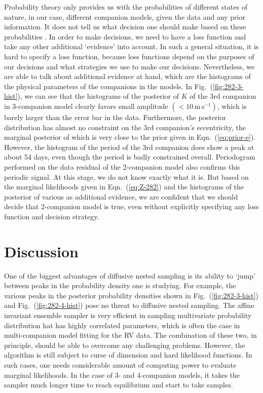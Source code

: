 \documentclass[letterpaper, preprint]{aastex}
\newcommand{\unit}[1]{\mathrm{#1}}
\begin{document}
Probability theory only provides us with the probabilities of different states of nature, in our case, different companion models, given the data and any prior information. It does not tell us what decision one should make based on these probabilities \citep{jaynes03a}. In order to make decisions, we need to have a loss function and take any other additional `evidence' into account. In such a general situation, it is hard to specify a loss function, because loss functions depend on the purposes of our decisions and what strategies we use to make our decisions. Nevertheless, we are able to talk about additional evidence at hand, which are the histograms of the physical parameters of the companions in the models. In Fig.~(\ref{fig:282-3-hist}), we can see that the histograms of the posterior of $K$ of the 3rd companion in 3-companion model clearly favors small amplitude $(<10\,\unit{m\,s^{-1}})$, which is barely larger than the error bar in the data. Furthermore, the posterior distribution has almost no constraint on the 3rd companion's eccentricity, the marginal posterior of which is very close to the prior given in Eqn.~(\ref{eq:prior-e}). However, the histogram of the period of the 3rd companion does show a peak at about 54 days, even though the period is badly constrained overall. Periodogram performed on the data residual of the 2-companion model also confirms this periodic signal. At this stage, we do not know exactly what it is. But based on the marginal likelihoods given in Eqn.~(\ref{eq:Z-282}) and the histograms of the posterior of various  as  additional evidence, we are confident that we should decide that 2-companion model is true, even without explicitly specifying any loss function and decision strategy.


\section{Discussion}
\label{sec:discussion}
One of the biggest advantages of diffusive nested sampling is its ability to `jump' between peaks in the probability density one is studying. For example, the various peaks in the posterior probability densities shown in Fig.~(\ref{fig:282-3-hist}) and Fig.~(\ref{fig:282-4-hist}) pose no threat to diffusive nested sampling. The affine invariant ensemble sampler is very efficient in sampling multivariate probability distribution hat has highly correlated parameters, which is often the case in multi-companion model fitting for the RV data. The combination of these two, in principle, should be able to overcome any challenging problems. However, the algorithm is still subject to curse of dimension and hard likelihood functions. In such cases, one needs considerable amount of computing power to evaluate marginal likelihoods. In the case of 3- and 4-companion models, it takes the sampler much longer time to reach equilibrium and start to take samples.
\end{document}
